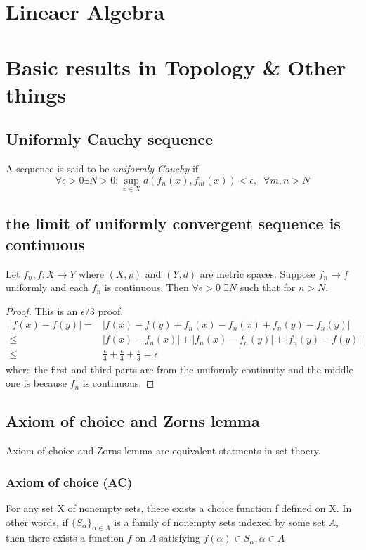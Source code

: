 \documentclass[titlepage]{article}
\begin{document}
\tableofcontents
\newpage
\section{Lineaer Algebra}

\section{Basic results in Topology \& Other things}
\subsection{Uniformly Cauchy sequence}
A sequence is said to be \textit{uniformly Cauchy} if
\begin{equation}
\forall \epsilon > 0 \exists N > 0 : \sup_{x\in X} d(f_n(x),f_m(x)) < \epsilon, \; \; \forall m,n > N
\end{equation}
\subsection{the limit of uniformly convergent sequence is continuous}
Let $f_n, f: X\rightarrow Y$ where $(X,\rho)$ and $(Y,d)$ are metric spaces. Suppose $f_n \rightarrow f$ uniformly and each $f_n$ is continuous. Then $\forall \epsilon >0 \; \exists N$ such that for $n>N$.
\begin{proof}
This is an $\epsilon/3$ proof. 
\begin{equation}
\begin{split}
|f(x) - f(y)| =&  |f(x) -f(y) +f_n(x) - f_n(x) + f_n(y) - f_n(y)|  \\ 
   \leq &  |f(x) - f_n(x)| + |f_n(x) - f_n(y)| + |f_n(y) - f(y)| \\
   \leq & \frac{\epsilon}{3} +\frac{\epsilon}{3} +\frac{\epsilon}{3} = \epsilon
\end{split}
\end{equation}
where the first and third parts are from the uniformly continuity and the middle one is because $f_n$ is continuous.
\end{proof}




\subsection{Axiom of choice and Zorns lemma}
Axiom of choice and Zorns lemma are equivalent statments in set thoery.
\subsubsection{Axiom of choice (AC)} 
For any set X of nonempty sets, there exists a choice function f defined on X.
In other words, if $\{S_\alpha\}_{\alpha \in A}$ is a family of nonempty sets indexed by some set $A$, then there exists a function $f$ on $A$ satisfying $f(\alpha) \in S_\alpha, \alpha \in A$
\end{document}
